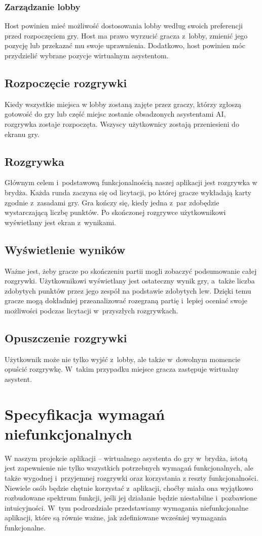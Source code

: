 \subsubsection{Zarządzanie lobby}
Host powinien mieć możliwość dostosowania lobby według swoich preferencji przed
rozpoczęciem gry. Host ma prawo wyrzucić gracza z~lobby, zmienić jego pozycję lub przekazać
mu swoje uprawnienia. Dodatkowo, host powinien móc przydzielić wybrane pozycje
wirtualnym asystentom.

\subsection{Rozpoczęcie rozgrywki}
Kiedy wszystkie miejsca w lobby zostaną zajęte przez graczy, którzy zgłoszą gotowość do gry
lub część miejsc zostanie obsadzonych asystentami AI, rozgrywka zostaje rozpoczęta.
Wszyscy użytkownicy zostają przeniesieni do ekranu gry.
\subsection{Rozgrywka}
Głównym celem i~podstawową funkcjonalnością naszej aplikacji jest
rozgrywka w brydża. Każda runda zaczyna się od licytacji, po której
gracze wykładają karty zgodnie z~zasadami gry. Gra kończy się, kiedy
jedna z~par zdobędzie wystarczającą liczbę punktów. Po skończonej
rozgrywce użytkownikowi wyświetlany jest ekran z~wynikami.
\subsection{Wyświetlenie wyników}
Ważne jest, żeby gracze po skończeniu partii mogli zobaczyć
podsumowanie całej rozgrywki. Użytkownikowi wyświetlany jest ostateczny
wynik gry, a~także liczba zdobytych punktów przez jego zespół na
podstawie zdobytych lew. Dzięki temu gracze mogą dokładniej
przeanalizować rozegraną partię i~lepiej oceniać swoje możliwości
podczas licytacji w~przyszłych rozgrywkach.
\subsection{Opuszczenie rozgrywki}
Użytkownik może nie tylko wyjść z~lobby, ale także w~dowolnym momencie
opuścić rozgrywkę. W~takim przypadku miejsce gracza zastępuje
wirtualny asystent.




\section{Specyfikacja wymagań niefunkcjonalnych}
W naszym projekcie aplikacji -- wirtualnego asystenta do gry w~brydża,
istotą jest zapewnienie nie tylko wszystkich potrzebnych wymagań
funkcjonalnych, ale także wygodnej i~przyjemnej rozgrywki oraz
korzystania z reszty funkcjonalności. Niewiele osób będzie chętnie
korzystać z~aplikacji, choćby miała ona wyjątkowo rozbudowane spektrum
funkcji, jeśli jej działanie będzie niestabilne i~pozbawione
intuicyjności. W~tym podrozdziale przedstawiamy wymagania
niefunkcjonalne aplikacji, które są równie ważne, jak zdefiniowane
wcześniej wymagania funkcjonalne.
